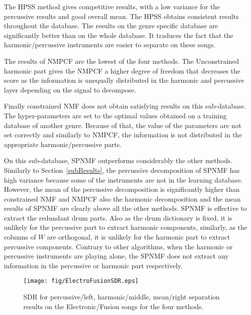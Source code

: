 The HPSS method gives competitive results, with a low variance for the percussive results and good overall mean. The HPSS obtains consistent results throughout the database. The results on the genre specific database are significantly better than on the whole database. It traduces the fact that the harmonic/percussive instruments are easier to separate on these songs. 
 
The results of NMPCF are the lowest of the four methods. The Unconstrained harmonic part gives the NMPCF a higher degree of freedom that decreases the score as the information is unequally distributed in the harmonic and percussive layer depending on the signal to decompose. 

Finally constrained NMF does not obtain satisfying results on this sub-database. The hyper-parameters are set to the optimal values obtained on a training database of another genre. Because of that, the value of the parameters are not set correctly and similarly to NMPCF, the information is not distributed in the appropriate harmonic/percussive parts. 


On this sub-database, SPNMF outperforms considerably the other methods. Similarly to Section~\ref{subResults}, the percussive decomposition of SPNMF has high variance because some of the instruments are not in the learning database. However, the mean of the percussive decomposition is significantly higher than constrained NMF and NMPCF also the harmonic decomposition and the mean results of SPNMF are clearly above all the other methods. SPNMF is effective to extract the redundant drum parts. Also as the drum dictionary is fixed, it is unlikely for the percussive part to extract harmonic components, similarly, as the columns of $W$ are orthogonal, it is unlikely for the harmonic part to extract percussive components. Contrary to other algorithms, when the harmonic or percussive instruments are playing alone, the SPNMF does not extract any information in the percussive or harmonic part respectively.



\begin{figure}[htb]

  \centering 
  \texttt{[image: fig/ElectroFusionSDR.eps]}
  \caption{\label{ElectroFusionSDR} SDR for percussive/left, harmonic/middle, mean/right separation results on the Electronic/Fusion songs for the four methods.}
  
\end{figure}

